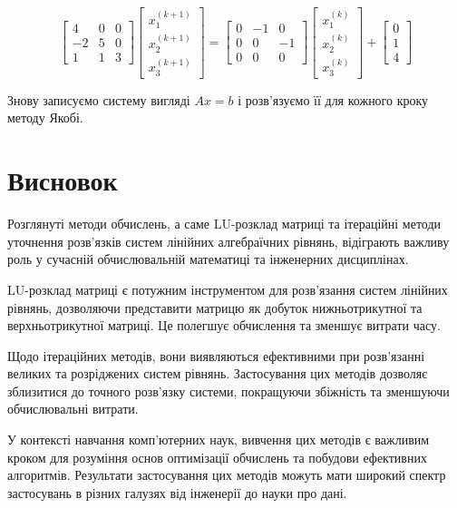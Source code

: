 \documentclass[12pt,a4paper]{article}
\begin{document}
\[
\begin{bmatrix}
    4 & 0 & 0 \\
    -2 & 5 & 0 \\
    1 & 1 & 3
\end{bmatrix}
\begin{bmatrix}
    x_1^{(k+1)} \\
    x_2^{(k+1)} \\
    x_3^{(k+1)}
\end{bmatrix}
=
\begin{bmatrix}
    0 & -1 & 0 \\
    0 & 0 & -1 \\
    0 & 0 & 0
\end{bmatrix}
\begin{bmatrix}
    x_1^{(k)} \\
    x_2^{(k)} \\
    x_3^{(k)}
\end{bmatrix}
+
\begin{bmatrix}
    0 \\
    1 \\
    4
\end{bmatrix}
\]

Знову записуємо систему вигляді \(Ax = b\) і розв'язуємо її для кожного кроку методу Якобі.

\section{Висновок}
\hspace{1 cm} Розглянуті методи обчислень, а саме LU-розклад матриці та ітераційні методи уточнення розв'язків систем лінійних алгебраїчних рівнянь, відіграють важливу роль у сучасній обчислювальній математиці та інженерних дисциплінах.

\hspace{0.5 cm}LU-розклад матриці є потужним інструментом для розв'язання систем лінійних рівнянь, дозволяючи представити матрицю як добуток нижньотрикутної та верхньотрикутної матриці. Це полегшує обчислення та зменшує витрати часу.

\hspace{0.5 cm} Щодо ітераційних методів, вони виявляються ефективними при розв'язанні великих та розріджених систем рівнянь. Застосування цих методів дозволяє зблизитися до точного розв'язку системи, покращуючи збіжність та зменшуючи обчислювальні витрати.

\hspace{0.5 cm} У контексті навчання комп'ютерних наук, вивчення цих методів є важливим кроком для розуміння основ оптимізації обчислень та побудови ефективних алгоритмів. Результати застосування цих методів можуть мати широкий спектр застосувань в різних галузях від інженерії до науки про дані.
\end{document}
